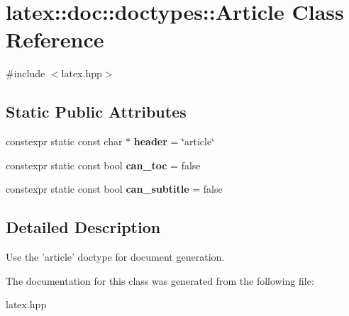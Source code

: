 \hypertarget{classlatex_1_1doc_1_1doctypes_1_1Article}{\section{latex\-:\-:doc\-:\-:doctypes\-:\-:Article Class Reference}
\label{classlatex_1_1doc_1_1doctypes_1_1Article}
}


{\ttfamily \#include $<$latex.\-hpp$>$}

\subsection*{Static Public Attributes}
\begin{DoxyCompactItemize}
\item 
\hypertarget{classlatex_1_1doc_1_1doctypes_1_1Article_a13ce4dd5c712f498e99029a8e8dc77b3}{constexpr static const char $\ast$ {\bfseries header} = \char`\"{}article\char`\"{}}\label{classlatex_1_1doc_1_1doctypes_1_1Article_a13ce4dd5c712f498e99029a8e8dc77b3}

\item 
\hypertarget{classlatex_1_1doc_1_1doctypes_1_1Article_ae8a3378f1d947c6300c7a6d8a01e09fc}{constexpr static const bool {\bfseries can\-\_\-toc} = false}\label{classlatex_1_1doc_1_1doctypes_1_1Article_ae8a3378f1d947c6300c7a6d8a01e09fc}

\item 
\hypertarget{classlatex_1_1doc_1_1doctypes_1_1Article_a7dc7e13e28ac8c09d92e367a1c470a27}{constexpr static const bool {\bfseries can\-\_\-subtitle} = false}\label{classlatex_1_1doc_1_1doctypes_1_1Article_a7dc7e13e28ac8c09d92e367a1c470a27}

\end{DoxyCompactItemize}


\subsection{Detailed Description}
Use the 'article' doctype for document generation. 

The documentation for this class was generated from the following file\-:\begin{DoxyCompactItemize}
\item 
latex.\-hpp\end{DoxyCompactItemize}
